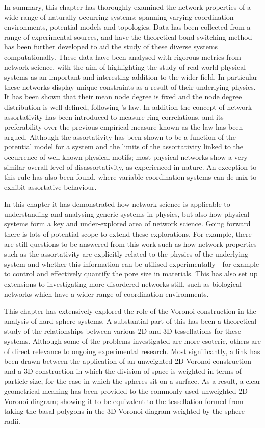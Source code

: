 In summary, this chapter has thoroughly examined the network properties of a wide range of naturally occurring \td{} systems; spanning varying coordination environments, potential models and topologies.
Data has been collected from a range of experimental sources, and have the theoretical bond switching method has been further developed to aid the study of these diverse systems computationally.
These data have been analysed with rigorous metrics from network science, with the aim of highlighting the study of real\--world physical systems as an important and interesting addition to the wider field.
In particular these networks display unique constraints as a result of their underlying physics.
It has been shown that their mean node degree is fixed and the node degree distribution is well defined, following \lm's law.
In addition the concept of network assortativity has been introduced to measure ring correlations, and its preferability over the previous empirical measure known as the \aw{} law has been argued.
Although the assortativity has been shown to be a function of the potential model for a system and the limits of the assortativity linked to the occurrence of well\--known physical motifs; most physical networks show a very similar overall level of disassortativity, as experienced in nature.
An exception to this rule has also been found, where variable\--coordination systems can de\--mix to exhibit assortative behaviour.

In this chapter it has demonstrated how network science is applicable to understanding and analysing generic systems in physics, but also how physical systems form a key and under\--explored area of network science.
Going forward there is lots of potential scope to extend these explorations.
For example, there are still questions to be answered from this work such as how network properties such as the assortativity are explicitly related to the physics of the underlying system and whether this information can be utilised experimentally \-- for example to control and effectively quantify the pore size in materials.
This has also set up extensions to investigating more disordered networks still, such as biological networks which have a wider range of coordination environments.




This chapter has extensively explored the role of the Voronoi construction in the analysis of \qtd{} hard sphere systems.
A substantial part of this has been a theoretical study of the relationships between various 2D and 3D tessellations for these systems.
Although some of the problems investigated are more esoteric, others are of direct relevance to ongoing experimental research.
Most significantly, a link has been drawn between the application of an unweighted 2D Voronoi construction and a 3D construction in which the division of space is weighted in terms of particle size, for the case in which the spheres sit on a surface.
As a result, a clear geometrical meaning has been provided to the commonly used unweighted 2D Voronoi diagram; showing it to be equivalent to the tessellation 
formed from taking the basal polygons in the 3D Voronoi diagram weighted by the sphere 
radii.

